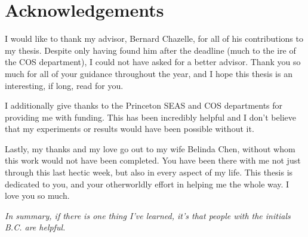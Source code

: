 \section*{Acknowledgements}
I would like to thank my advisor, Bernard Chazelle, for all of his contributions to my thesis.
Despite only having found him after the deadline (much to the ire of the COS department), I could not have asked for a better advisor.
Thank you so much for all of your guidance throughout the year, and I hope this thesis is an interesting, if long, read for you.

I additionally give thanks to the Princeton SEAS and COS departments for providing me with funding.
This has been incredibly helpful and I don't believe that my experiments or results would have been possible without it.

Lastly, my thanks and my love go out to my wife Belinda Chen, without whom this work would not have been completed.
You have been there with me not just through this last hectic week, but also in every aspect of my life.
This thesis is dedicated to you, and your otherworldly effort in helping me the whole way.
I love you so much.

\vspace{2\baselineskip}
\begin{center}
\emph{In summary, if there is one thing I've learned, it's that people with the initials B.C. are helpful.}
\end{center}
